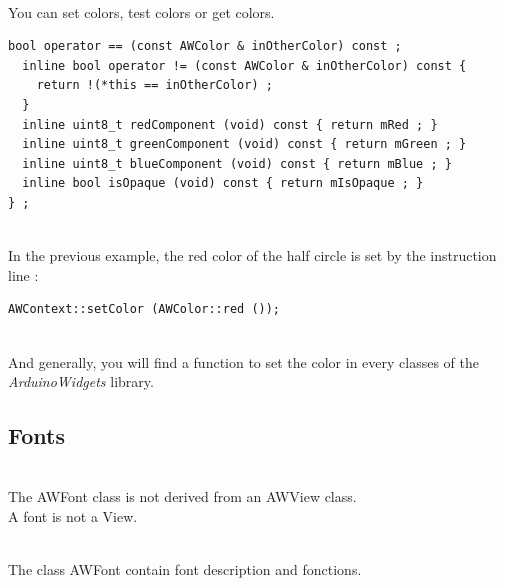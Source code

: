 \documentclass[a4paper,11pt]{extarticle}
\begin{document}
~\\ You can set colors, test colors or get colors.

\begin{lstlisting}[language=Arduinonl]
  bool operator == (const AWColor & inOtherColor) const ;
  inline bool operator != (const AWColor & inOtherColor) const {
    return !(*this == inOtherColor) ;
  }
  inline uint8_t redComponent (void) const { return mRed ; }
  inline uint8_t greenComponent (void) const { return mGreen ; }
  inline uint8_t blueComponent (void) const { return mBlue ; }
  inline bool isOpaque (void) const { return mIsOpaque ; }
} ;
\end{lstlisting}


~\\ In the previous example, the red color of the half circle is set by the instruction line :

\begin{lstlisting}[language=Arduinonl]
  AWContext::setColor (AWColor::red ());
\end{lstlisting}

~\\ And generally, you will find a function to set the color in every classes of the \emph{ArduinoWidgets} library.


\newpage
\subsection{Fonts}

~\\ The AWFont class is not derived from an AWView class.
~\\ A font is not a View.

~\\ The class AWFont contain font description and fonctions.
\end{document}

